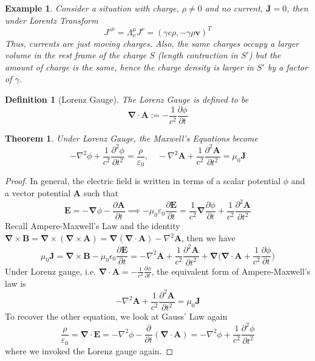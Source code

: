 \documentclass[a4paper]{article}
\newtheorem{eg}{Example}[section]
\theoremstyle{new}
\newtheorem{defi}{Definition}[section]
\newtheorem{thm}{Theorem}[section]
\begin{document}
\begin{eg}
Consider a situation with charge, $\rho\neq0$ and no current, $\mathbf{J}=0$, then under Lorentz Transform
$$J'^\mu=\Lambda_\nu^\mu J^\nu=(\gamma c\rho,-\gamma\rho\mathbf{v})^T$$
Thus, currents are just moving charges. Also, the same charges occupy a larger volume in the rest frame of the charge $S$ (length contraction in $S'$) but the amount of charge is the same, hence the charge density is larger in $S'$ by a factor of $\gamma$.
\end{eg}
\begin{defi}[Lorenz Gauge]
The Lorenz Gauge is defined to be
$$\boldsymbol{\nabla}\cdot\mathbf{A}:=-\frac{1}{c^2}\frac{\partial\phi}{\partial t}$$
\end{defi}
\begin{thm}
Under Lorenz Gauge, the Maxwell's Equations become
$$-\nabla^2\phi+\frac{1}{c^2}\frac{\partial^2\phi}{\partial t^2}=\frac{\rho}{\varepsilon_0},\quad-\nabla^2\mathbf{A}+\frac{1}{c^2}\frac{\partial^2\mathbf{A}}{\partial t^2}=\mu_0\mathbf{J}$$
\end{thm}
\begin{proof}
In general, the electric field is written in terms of a scalar potential $\phi$ and a vector potential $\mathbf{A}$ such that
$$\mathbf{E}=-\boldsymbol{\nabla}\phi-\frac{\partial\mathbf{A}}{\partial t}\implies-\mu_0\varepsilon_0\frac{\partial\mathbf{E}}{\partial t}=\frac{1}{c^2}\boldsymbol{\nabla}\frac{\partial\phi}{\partial t}+\frac{1}{c^2}\frac{\partial^2\mathbf{A}}{\partial t^2}$$
Recall Ampere-Maxwell's Law and the identity $\boldsymbol{\nabla}\times\mathbf{B}=\boldsymbol{\nabla}\times(\boldsymbol{\nabla}\times\mathbf{A})=\boldsymbol{\nabla}(\boldsymbol{\nabla}\cdot\mathbf{A})-\nabla^2\mathbf{A}$, then we have
$$\mu_0\mathbf{J}=\boldsymbol{\nabla}\times\mathbf{B}-\mu_0\epsilon_0\frac{\partial\mathbf{E}}{\partial t}=-\nabla^2\mathbf{A}+\frac{1}{c^2}\frac{\partial^2\mathbf{A}}{\partial t^2}+\boldsymbol{\nabla}\bigg(\boldsymbol{\nabla}\cdot\mathbf{A}+\frac{1}{c^2}\frac{\partial\phi}{\partial t}\bigg)$$
Under Lorenz gauge, i.e. $\boldsymbol{\nabla}\cdot\mathbf{A}=-\frac{1}{c^2}\frac{\partial\phi}{\partial t}$, the equivalent form of Ampere-Maxwell's law is
$$-\nabla^2\mathbf{A}+\frac{1}{c^2}\frac{\partial^2\mathbf{A}}{\partial t^2}=\mu_0\mathbf{J}$$
To recover the other equation, we look at Gauss' Law again
$$\frac{\rho}{\varepsilon_0}=\boldsymbol{\nabla}\cdot\mathbf{E}=-\nabla^2\phi-\frac{\partial}{\partial t}(\boldsymbol{\nabla}\cdot\mathbf{A})=-\nabla^2\phi+\frac{1}{c^2}\frac{\partial^2\phi}{\partial t^2}$$
where we invoked the Lorenz gauge again.
\end{proof}
\end{document}
